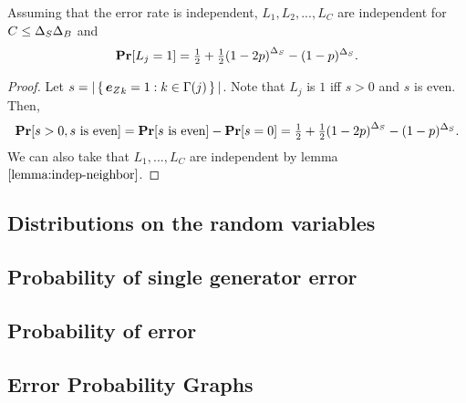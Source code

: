 \begin{lemma}{
	Assuming that the error rate is independent,
	$L_1, L_2, ..., L_C$ are independent for $C \leq {\Delta_{S}} {\Delta_{B}}$ and
	$$
		\Pr[L_j = 1] = \PrL.
	$$
}
\begin{proof}
	Let $s = |\set{{\boldsymbol{e}_Z}_k = 1 : k \in \Gamma(j)}|$.
	Note that $L_j$ is $1$ iff $s > 0$ and $s$ is even.
	Then,
	$$
		\Pr[s > 0, s \text{ is even}] = \Pr[s\text{ is even}] - \Pr[s = 0] = \PrL.
	$$
	We can also take that $L_1, ..., L_C$ are independent by lemma $\ref{lemma:indep-neighbor}$.
\end{proof}
\end{lemma}


\subsection*{Distributions on the random variables}

\subsection*{Probability of single generator error}

\subsection*{Probability of error}

\subsection*{Error Probability Graphs}


\newpage



